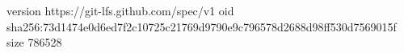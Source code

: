 version https://git-lfs.github.com/spec/v1
oid sha256:73d1474e0d6ed7f2c10725c21769d9790e9c796578d2688d98ff530d7569015f
size 786528

